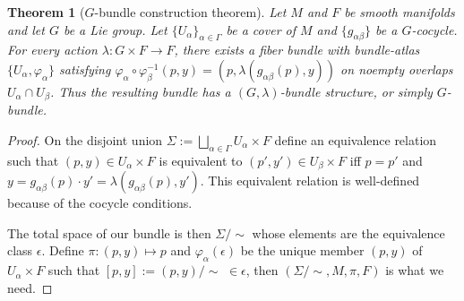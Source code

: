 \documentclass[11pt]{article}
\theoremstyle{definition}
\theoremstyle{plain}
\newtheorem{thm}[para]{Theorem}
\begin{document}
\begin{thm}[$G$-bundle construction theorem]
	Let $M$ and $F$ be smooth manifolds and let $G$ be a Lie group. Let $\{U_\alpha\}_{\alpha\in \Gamma}$ be a cover of $M$ and $\{g_{\alpha\beta}\}$ be a $G$-cocycle. For {every} action $\lambda:G\times F\to F$, there exists a fiber bundle with bundle-atlas $\{U_\alpha,\varphi_\alpha\}$ satisfying $\varphi_\alpha\circ \varphi_\beta^{-1}(p,y)=(p,\lambda(g_{\alpha\beta}(p),y))$ on noempty overlaps $U_\alpha\cap U_\beta$. Thus the resulting bundle has a $(G,\lambda)$-bundle structure, or simply $G$-bundle.
\end{thm}

\begin{proof}
	On the disjoint union $\Sigma:=\bigsqcup_{\alpha\in \Gamma}U_\alpha\times F$ define an equivalence relation such that $(p,y)\in U_\alpha\times F$ is equivalent to $(p',y')\in U_\beta\times F$ iff $p=p'$ and $y=g_{\alpha\beta}(p)\cdot y'=\lambda(g_{\alpha\beta}(p),y')$. This equivalent relation is well-defined because of the cocycle conditions. 
	
	The total space of our bundle is then $\Sigma/\!\!\sim$ whose elements are the equivalence class $\epsilon$. Define $\pi:(p,y)\mapsto p$ and $\varphi_\alpha(\epsilon)$ be the unique member $(p,y)$ of $U_\alpha\times F$ such that $[p,y]:=(p,y)/\!\!\sim\,\,\in \epsilon$, then $(\Sigma/\!\!\sim,M,\pi,F)$ is what we need.
\end{proof}
\end{document}
